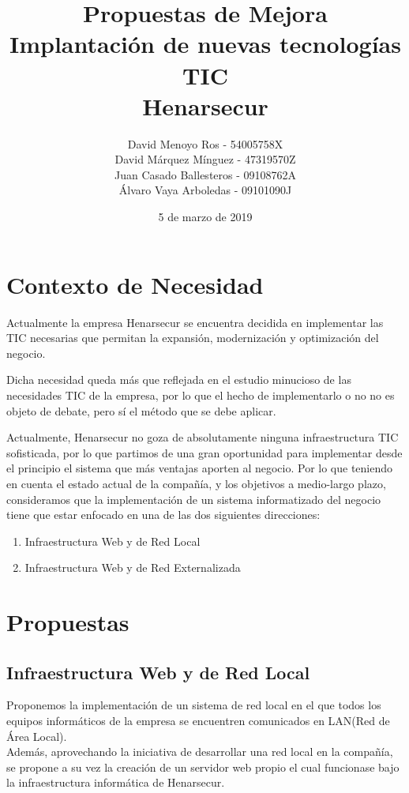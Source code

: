 \documentclass[12pt,letterpaper]{article}
\title{Propuestas de Mejora\\ Implantación de nuevas tecnologías TIC\\ \textbf{Henarsecur} }
\author{David Menoyo Ros - 54005758X\\
		David Márquez Mínguez - 47319570Z\\
		Juan Casado Ballesteros - 09108762A\\
		Álvaro Vaya Arboledas - 09101090J\\
		}
\date{5 de marzo de 2019}
\begin{document}
	\maketitle %
			   
	\newpage
	\section{Contexto de Necesidad}
	Actualmente la empresa Henarsecur se encuentra decidida en implementar las TIC necesarias que permitan la expansión, modernización y optimización del negocio.\par
	Dicha necesidad queda más que reflejada en el estudio minucioso de las necesidades TIC de la empresa, por lo que el hecho de implementarlo o no no es objeto de debate, pero sí el método que se debe aplicar.\par
	Actualmente, Henarsecur no goza de absolutamente ninguna infraestructura TIC sofisticada, por lo que partimos de una gran oportunidad para implementar desde el principio el sistema que más ventajas aporten al negocio. Por lo que teniendo en cuenta el estado actual de la compañía, y los objetivos a medio-largo plazo, consideramos que la implementación de un sistema informatizado del negocio tiene que estar enfocado en una de las dos siguientes direcciones:
	\begin{enumerate}
	\item Infraestructura Web y de Red Local
	\item Infraestructura Web y de Red Externalizada
	\end{enumerate}
	
	\section{Propuestas}
	\subsection{Infraestructura Web y de Red Local}
	
	Proponemos la implementación de un sistema de red local en el que todos los equipos informáticos de la empresa se encuentren comunicados en LAN(Red de Área Local).\\
	Además, aprovechando la iniciativa de desarrollar una red local en la compañía, se propone a su vez la creación de un servidor web propio el cual funcionase bajo la infraestructura informática de Henarsecur.\par
\end{document}
